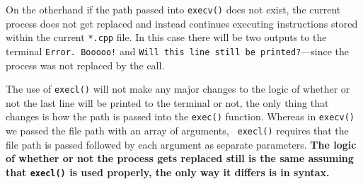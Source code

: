 \documentclass{article}
\begin{document}
\begin{enumerate}
    On the otherhand if the path passed into \texttt{execv()} does not exist, the current process does not get replaced and instead continues executing instructions
    stored within the current \texttt{*.cpp} file. In this case there will be two outputs to the terminal \texttt{Error. Booooo!} and \texttt{Will this line still be
    printed?}---since the process was not replaced by the call.
    \vspace{1em}

    The use of \texttt{execl()} will not make any major changes to the logic of whether or not the last line will be printed to the terminal or not, the only thing
    that changes is how the path is passed into the \texttt{exec()} function. Whereas in \texttt{execv()} we passed the file path with an array of arguments, \texttt{
    execl()} requires that the file path is passed followed by each argument as separate parameters. \textbf{The logic of whether or not the process gets replaced still is
    the same assuming that \texttt{execl()} is used properly, the only way it differs is in syntax.}

\end{enumerate}
\end{document}
